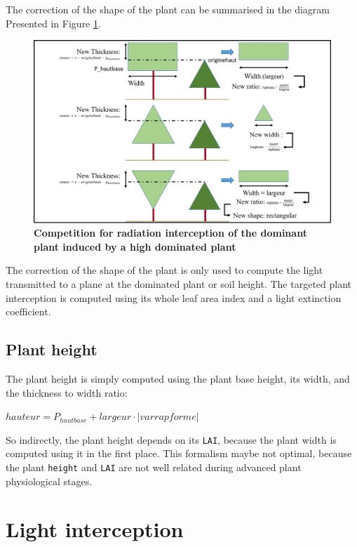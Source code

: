 \documentclass[]{book}
\theoremstyle{definition}
\theoremstyle{definition}
\theoremstyle{definition}
\theoremstyle{remark}
\begin{document}
The correction of the shape of the plant can be summarised in the
diagram Presented in Figure \ref{fig:Comprad}.

\begin{figure}
\centering
\includegraphics{img/Light-interception-dominant-2.png}
\caption{\label{fig:Comprad}\textbf{Competition for radiation interception
of the dominant plant induced by a high dominated plant}}
\end{figure}

The correction of the shape of the plant is only used to compute the
light transmitted to a plane at the dominated plant or soil height. The
targeted plant interception is computed using its whole leaf area index
and a light extinction coefficient.

\subsection{Plant height}\label{plant-height}

The plant height is simply computed using the plant base height, its
width, and the thickness to width ratio:

\(hauteur=P_{hautbase}+largeur\cdot\left|varrapforme\right|\)

So indirectly, the plant height depends on its \texttt{LAI}, because the
plant width is computed using it in the first place. This formalism
maybe not optimal, because the plant \texttt{height} and \texttt{LAI}
are not well related during advanced plant physiological stages.

\section{Light interception}\label{light-interception}
\end{document}
